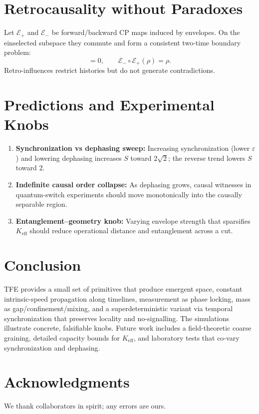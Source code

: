 \documentclass[11pt]{article}
\newcommand{\Keff}{K_{\mathrm{eff}}}
\begin{document}
\section{Retrocausality without Paradoxes}
Let $\mathcal E_{+}$ and $\mathcal E_{-}$ be forward/backward CP maps induced by envelopes. On the einselected subspace they commute and form a consistent two-time boundary problem:
\begin{equation}
[\mathcal E_{+},\mathcal E_{-}]=0,\qquad
\mathcal E_{-}\circ \mathcal E_{+}(\rho)=\rho.
\end{equation}
Retro-influences restrict histories but do not generate contradictions.

\section{Predictions and Experimental Knobs}
\begin{enumerate}[label=(\alph*)]
\item \textbf{Synchronization vs dephasing sweep:} Increasing synchronization (lower $\varepsilon$) and lowering dephasing increases $S$ toward $2\sqrt2$; the reverse trend lowers $S$ toward $2$.
\item \textbf{Indefinite causal order collapse:} As dephasing grows, causal witnesses in quantum-switch experiments should move monotonically into the causally separable region.
\item \textbf{Entanglement--geometry knob:} Varying envelope strength that sparsifies $\Keff$ should reduce operational distance and entanglement across a cut.
\end{enumerate}

\section{Conclusion}
TFE provides a small set of primitives that produce emergent space, constant intrinsic-speed propagation along timelines, measurement as phase locking, mass as gap/confinement/mixing, and a superdeterministic variant via temporal synchronization that preserves locality and no-signalling. The simulations illustrate concrete, falsifiable knobs. Future work includes a field-theoretic coarse graining, detailed capacity bounds for $\Keff$, and laboratory tests that co-vary synchronization and dephasing.

\section*{Acknowledgments}
We thank collaborators in spirit; any errors are ours.
\end{document}
